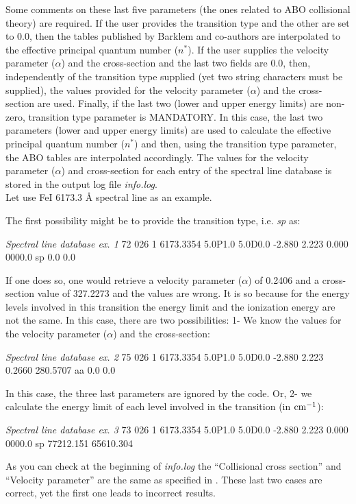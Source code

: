 Some comments on these last five parameters (the ones related to ABO collisional theory) are required. If the user provides the transition type and the other are set to 0.0, then the tables published by Barklem and co-authors are interpolated to the effective principal quantum number ($n^{*}$). If the user supplies the velocity parameter ($\alpha$) and the cross-section and the last two fields are 0.0, then, independently of the transition type supplied (yet two string characters must be supplied), the values provided for the velocity parameter ($\alpha$) and the cross-section are used. Finally, if the last two (lower and upper energy limits) are non-zero, transition type parameter is MANDATORY. In this case, the last two parameters (lower and upper energy limits) are used to calculate the effective principal quantum number ($n^{*}$) and then, using the transition type parameter, the ABO tables are interpolated accordingly. The values for the velocity parameter ($\alpha$) and cross-section for each entry of the spectral line database is stored in the output log file {\it info.log}.\\

Let use Fe{\sc I} 6173.3 {\AA} spectral line as an example.

The first possibility might be to provide the transition type, i.e. {\it sp} as:\\

\begin{sldbox}[label={tb:sldex01}]{{\it Spectral line database ex. 1}}
  \scriptsize
  72  026  1   6173.3354  5.0P1.0  5.0D0.0  -2.880  2.223  0.000  0000.0 sp 0.0  0.0
  \normalsize
\end{sldbox}

If one does so, one would retrieve a velocity parameter ($\alpha$) of 0.2406 and a cross-section value of 327.2273 and the values are wrong. It is so because for the energy levels involved in this transition the energy limit and the ionization energy are not the same. In this case, there are two possibilities: 1- We know the values for the velocity parameter ($\alpha$) and the cross-section:

\begin{sldbox}[label={tb:sldex02}]{{\it Spectral line database ex. 2}}
  \scriptsize
  75  026  1   6173.3354  5.0P1.0  5.0D0.0  -2.880  2.223  0.2660  280.5707 aa 0.0  0.0
  \normalsize
\end{sldbox}

In this case, the three last parameters are ignored by the code. Or, 2- we calculate the energy limit of each level involved in the transition (in ${\rm cm}^{-1}$):

\begin{sldbox}[label={tb:sldex03}]{{\it Spectral line database ex. 3}}
  \scriptsize
  73  026  1   6173.3354  5.0P1.0  5.0D0.0  -2.880  2.223  0.000  0000.0 sp 77212.151  65610.304
  \normalsize
\end{sldbox}

As you can check at the beginning of {\it info.log} the ``Collisional cross section'' and ``Velocity parameter'' are the same as specified in . These last two cases are correct, yet the first one leads to incorrect results.


